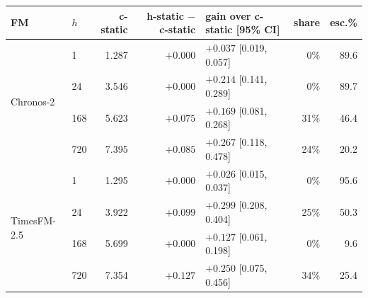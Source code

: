 \begin{tabular}{llrrlrr}
\toprule
FM & $h$ & c-static & h-static $-$ c-static & gain over c-static [95\% CI] & share & esc.\% \\
\midrule
\multirow{4}{*}{Chronos-2}
 & 1 & 1.287 & $+0.000$ & $+0.037$ [0.019, 0.057] & 0\% & 89.6 \\
 & 24 & 3.546 & $+0.000$ & $+0.214$ [0.141, 0.289] & 0\% & 89.7 \\
 & 168 & 5.623 & $+0.075$ & $+0.169$ [0.081, 0.268] & 31\% & 46.4 \\
 & 720 & 7.395 & $+0.085$ & $+0.267$ [0.118, 0.478] & 24\% & 20.2 \\
\midrule
\multirow{4}{*}{TimesFM-2.5}
 & 1 & 1.295 & $+0.000$ & $+0.026$ [0.015, 0.037] & 0\% & 95.6 \\
 & 24 & 3.922 & $+0.099$ & $+0.299$ [0.208, 0.404] & 25\% & 50.3 \\
 & 168 & 5.699 & $+0.000$ & $+0.127$ [0.061, 0.198] & 0\% & 9.6 \\
 & 720 & 7.354 & $+0.127$ & $+0.250$ [0.075, 0.456] & 34\% & 25.4 \\
\bottomrule
\end{tabular}
